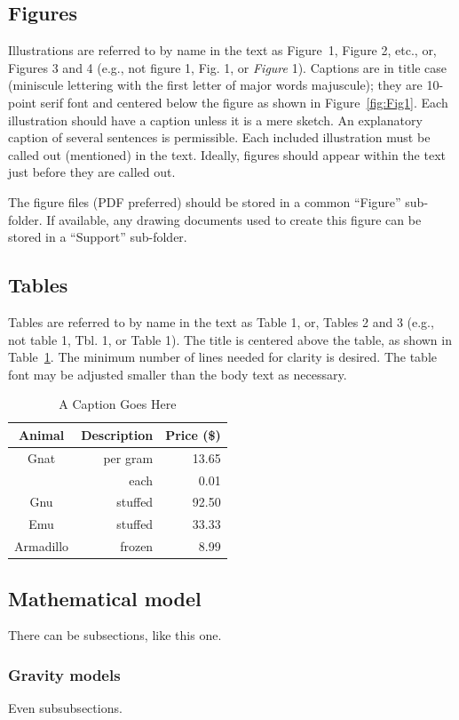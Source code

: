 \subsection{Figures}
Illustrations are referred to by name in the text as Figure~1, Figure 2, etc., or, Figures 3 and 4 (e.g., not figure 1, Fig. 1, or \emph{Figure} 1). Captions are in title case (miniscule lettering with the first letter of major words majuscule); they are 10-point serif font and centered below the figure as shown in Figure~\ref{fig:Fig1}. Each illustration should have a caption unless it is a mere sketch. An explanatory caption of several sentences is permissible. Each included illustration must be called out (mentioned) in the text. Ideally, figures should appear within the text just before they are called out. 

The figure files (PDF preferred) should be stored in a common ``Figure'' sub-folder.  If available, any drawing documents used to create this figure can be stored in a ``Support'' sub-folder.

\subsection{Tables}
Tables are referred to by name in the text as Table 1, or, Tables 2 and 3 (e.g., not table 1, Tbl. 1, or Table 1). The title is centered above the table, as shown in Table~\ref{tab:label}. The minimum number of lines needed for clarity is desired. The table font may be adjusted smaller than the body text as necessary.

\begin{table}[htbp]
	\caption{A Caption Goes Here}
	\label{tab:label}
	\centering \fontsize{10}{10}\selectfont
	\begin{tabular}{c | r | r } %
		\hline 
		Animal    & Description & Price (\$)\\
		\hline 
		Gnat      & per gram & 13.65 \\
		& each     &  0.01 \\
		Gnu       & stuffed  & 92.50 \\
		Emu       & stuffed  & 33.33 \\
		Armadillo & frozen   &  8.99 \\
		\hline
	\end{tabular}
\end{table}

\subsection{Mathematical model}
There can be subsections, like this one.

\subsubsection{Gravity models}
Even subsubsections. 